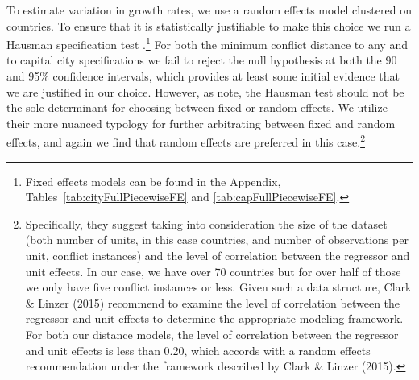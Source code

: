 To estimate variation in growth rates, we use a random effects model clustered on countries. To ensure that it is statistically justifiable to make this choice we run a Hausman specification test \citep{greene:2008}.\footnote{Fixed effects models can be found in the Appendix, Tables~\ref{tab:cityFullPiecewiseFE} and \ref{tab:capFullPiecewiseFE}.} For both the minimum conflict distance to any and to capital city specifications we fail to reject the null hypothesis at both the 90 and 95\% confidence intervals, which provides at least some initial evidence that we are justified in our choice. However, as \citet{clark:linzer:2015} note, the Hausman test should not be the sole determinant for choosing between fixed or random effects. We utilize their more nuanced typology for further arbitrating between fixed and random effects, and again we find that random effects are preferred in this case.\footnote{Specifically, they suggest taking into consideration the size of the dataset (both number of units, in this case countries, and number of observations per unit, conflict instances) and the level of correlation between the regressor and unit effects. In our case, we have over 70 countries but for over half of those we only have five conflict instances or less. Given such a data structure, Clark \& Linzer (2015) recommend to examine the level of correlation between the regressor and unit effects to determine the appropriate modeling framework. For both our distance models, the level of correlation between the regressor and unit effects is less than 0.20, which accords with a random effects recommendation under the framework described by Clark \& Linzer (2015).}


